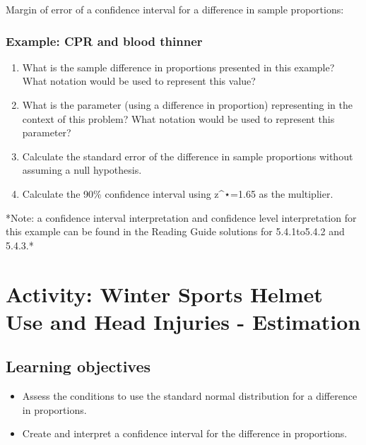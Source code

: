\documentclass[
]{report}
\newcommand{\rgs}{\vspace{12pt}} %
\newcommand{\rgi}{\hspace{24pt}}  %
\begin{document}
Margin of error of a confidence interval for a difference in sample proportions:
\rgs

\hypertarget{example-cpr-and-blood-thinner-3}{%
\subsubsection*{Example: CPR and blood thinner}\label{example-cpr-and-blood-thinner-3}}

\begin{enumerate}
\def\labelenumi{\arabic{enumi}.}
\item
  What is the sample difference in proportions presented in this example? What notation would be used to represent this value?
  \rgs
\item
  What is the parameter (using a difference in proportion) representing in the context of this problem? What notation would be used to represent this parameter?
  \rgs
\item
  Calculate the standard error of the difference in sample proportions without assuming a null hypothesis.
  \rgs
\item
  Calculate the 90\% confidence interval using z\^{}⋆=1.65 as the multiplier.
  \rgs
\end{enumerate}

\rgi *Note: a confidence interval interpretation and confidence level interpretation for this example can be found in the Reading Guide solutions for 5.4.1to5.4.2 and 5.4.3.*

\newpage

\hypertarget{activity-winter-sports-helmet-use-and-head-injuries---estimation}{%
\section{Activity: Winter Sports Helmet Use and Head Injuries - Estimation}\label{activity-winter-sports-helmet-use-and-head-injuries---estimation}}


\hypertarget{learning-objectives-5}{%
\subsection{Learning objectives}\label{learning-objectives-5}}

\begin{itemize}
\item
  Assess the conditions to use the standard normal distribution for a difference in proportions.
\item
  Create and interpret a confidence interval for the difference in proportions.
\end{itemize}
\end{document}
